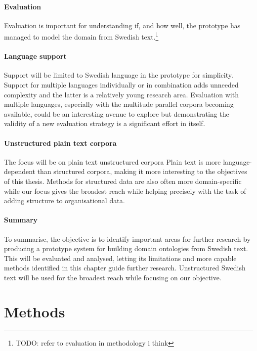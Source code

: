 \documentclass[a4paper]{report}
\newcommand{\todo}[1]{\footnote{{\color{red} TODO: #1}}}
\begin{document}
\subsubsection{Evaluation}

Evaluation is important for understanding if, and how well, the prototype has managed to model the domain from Swedish text.\todo{refer to evaluation in methodology i think}

\subsubsection{Language support}

Support will be limited to Swedish language in the prototype for simplicity.
Support for multiple languages individually or in combination adds unneeded complexity and the latter is a relatively young research area.
Evaluation with multiple languages, especially with the multitude parallel corpora becoming available, could be an interesting avenue to explore but demonstrating the validity of a new evaluation strategy is a significant effort in itself.

\subsubsection{Unstructured plain text corpora}

The focus will be on plain text unstructured corpora
Plain text is more language-dependent than structured corpora, making it more interesting to the objectives of this thesis.
Methods for structured data are also often more domain-specific while our focus gives the broadest reach while helping precisely with the task of adding structure to organisational data.

\subsubsection{Summary}

To summarise, the objective is to identify important areas for further research by producing a prototype system for building domain ontologies from Swedish text. This will be evaluated and analysed, letting its limitations and more capable methods identified in this chapter guide further research. Unstructured Swedish text will be used for the broadest reach while focusing on our objective.

\chapter{Methods}
\end{document}
